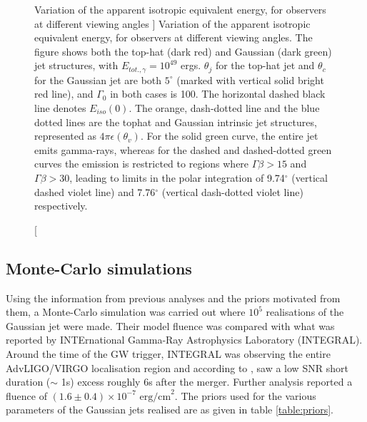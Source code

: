     \begin{figure}
        \centering
        \def\svgwidth{\textwidth}
        
        \caption
        [
            Variation of the apparent isotropic equivalent energy, for observers at
            different viewing angles
        ]
        {
            Variation of the apparent isotropic equivalent energy, for observers at
            different viewing angles. The figure shows both the top-hat (dark red)
            and Gaussian (dark green) jet structures, with $E_{tot., \gamma} =
            10^{49}$ ergs. $\theta_j$ for the top-hat jet and $\theta_c$ for the
            Gaussian jet are both $5^{\circ}$ (marked with vertical solid bright
            red line), and $\Gamma_0$ in both cases is 100. The horizontal dashed
            black line denotes $E_{iso}(0)$. The orange, dash-dotted line and the
            blue dotted lines are the tophat and Gaussian intrinsic jet structures,
            represented as $4\pi\epsilon(\theta_v)$. For the solid green curve, the
            entire jet emits gamma-rays, whereas for the dashed and dashed-dotted
            green curves the emission is restricted to regions where $\Gamma \beta
            > 15$ and $\Gamma \beta  > 30$, leading to limits in the polar
            integration of 9.74$^\circ$ (vertical dashed violet line) and
            7.76$^\circ$ (vertical dash-dotted violet line) respectively.
        }
        \label{fig:e_iso}
    \end{figure}

    \subsection{Monte-Carlo simulations}
    \label{sec:mc_sim}

    Using the information from previous analyses and the priors motivated from them, a
    Monte-Carlo simulation was carried out where $10^5$ realisations of the Gaussian jet
    were made. Their model fluence was compared with what was reported by INTErnational
    Gamma-Ray Astrophysics Laboratory (INTEGRAL).\\
    Around the time of the GW trigger, INTEGRAL was observing the entire AdvLIGO/VIRGO
    localisation region and according to \cite{minaev_gcn_2019}, saw a low SNR short
    duration ($\sim$ 1s) excess roughly 6s after the merger. Further analysis reported a
    fluence of $(1.6 \pm 0.4) \times 10^{-7} \text{ erg/cm}^2$. The priors used for the
    various parameters of the Gaussian jets realised are as given in table
    \ref{table:priors}.

